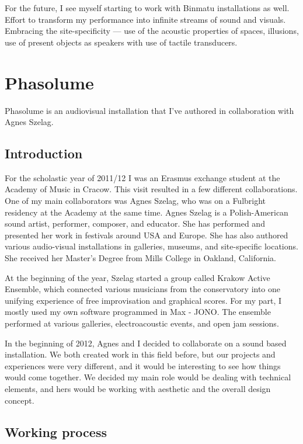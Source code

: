 \documentclass[12pt,a4paper,oneside]{report}
\begin{document}
For the future, I see myself starting to work with Binmatu installations as well. Effort to transform my performance into infinite streams of sound and visuals. Embracing the site-specificity --- use of the acoustic properties of spaces, illusions, use of present objects as speakers with use of tactile transducers.


\section{Phasolume} Phasolume is an audiovisual installation that I've authored in collaboration with Agnes Szelag.

\subsection{Introduction} 

For the scholastic year of 2011/12 I was an Erasmus exchange student at the Academy of Music in Cracow. This visit resulted in a few different collaborations. One of my main collaborators was Agnes Szelag, who was on a Fulbright residency at the Academy at the same time.  Agnes Szelag is a Polish-American sound artist, performer, composer, and educator. She has performed and presented her work in festivals around USA and Europe. She has also authored various audio-visual installations in galleries, museums, and site-specific locations. She received her Master’s Degree from Mills College in Oakland, California.

At the beginning of the year, Szelag started a group called Krakow Active Ensemble, which connected various musicians from the conservatory into one unifying experience of free improvisation and graphical scores. For my part, I mostly used my own software programmed in Max - JONO. The ensemble performed at various galleries, electroacoustic events, and open jam sessions.

In the beginning of 2012, Agnes and I decided to collaborate on a sound based installation. We both created work in this field before, but our projects and experiences were very different, and it would be interesting to see how things would come together.  We decided my main role would be dealing with technical elements, and hers would be working with aesthetic and the overall design concept.

\subsection{Working process} 
\end{document}
